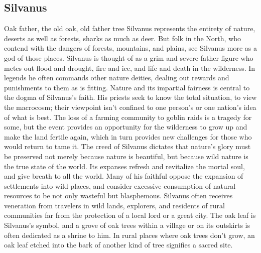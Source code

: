 \documentclass[10pt,a4paper,twoside,twocolumn,openany,bg=print,nodeprecatedcode]{dndbook}
\begin{document}
\subsection{Silvanus}
Oak father, the old oak, old father tree
Silvanus represents the entirety of nature, deserts as well as forests, sharks as much as deer. But folk in the North, who contend with the dangers of forests, mountains, and plains, see Silvanus more as a god of those places. Silvanus is thought of as a grim and severe father figure who metes out flood and drought, fire and ice, and life and death in the wilderness. In legends he often commands other nature deities, dealing out rewards and punishments to them as is fitting.
Nature and its impartial fairness is central to the dogma of Silvanus's faith. His priests seek to know the total situation, to view the macrocosm; their viewpoint isn't confined to one person's or one nation's idea of what is best. The loss of a farming community to goblin raids is a tragedy for some, but the event provides an opportunity for the wilderness to grow up and make the land fertile again, which in turn provides new challenges for those who would return to tame it.
The creed of Silvanus dictates that nature's glory must be preserved not merely because nature is beautiful, but because wild nature is the true state of the world. Its expanses refresh and revitalize the mortal soul, and give breath to all the world. Many of his faithful oppose the expansion of settlements into wild places, and consider excessive consumption of natural resources to be not only wasteful but blasphemous.
Silvanus often receives veneration from travelers in wild lands, explorers, and residents of rural communities far from the protection of a local lord or a great city. The oak leaf is Silvanus's symbol, and a grove of oak trees within a village or on its outskirts is often dedicated as a shrine to him. In rural places where oak trees don't grow, an oak leaf etched into the bark of another kind of tree signifies a sacred site.
\end{document}
